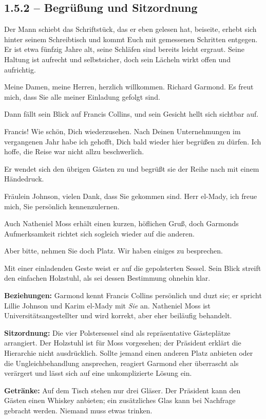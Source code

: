 \subsection{1.5.2 -- Begrü\ss{}ung und Sitzordnung}
\begin{vorlesetextalle}
Der Mann schiebt das Schriftstück, das er eben gelesen hat, beiseite, erhebt sich hinter seinem Schreibtisch und kommt Euch mit gemessenen Schritten entgegen. Er ist etwa fünfzig Jahre alt, seine Schläfen sind bereits leicht ergraut. Seine Haltung ist aufrecht und selbstsicher, doch sein Lächeln wirkt offen und aufrichtig.

\glqq{}Meine Damen, meine Herren, herzlich willkommen. Richard Garmond. Es freut mich, dass Sie alle meiner Einladung gefolgt sind.\grqq{}

Dann fällt sein Blick auf Francis Collins, und sein Gesicht hellt sich sichtbar auf.

\glqq{}Francis! Wie schön, Dich wiederzusehen. Nach Deinen Unternehmungen im vergangenen Jahr habe ich gehofft, Dich bald wieder hier begrü\ss{}en zu dürfen. Ich hoffe, die Reise war nicht allzu beschwerlich.\grqq{}

Er wendet sich den übrigen Gästen zu und begrü\ss{}t sie der Reihe nach mit einem Händedruck.

\glqq{}Fräulein Johnson, vielen Dank, dass Sie gekommen sind. Herr el-Mady, ich freue mich, Sie persönlich kennenzulernen.\grqq{}

Auch Natheniel Moss erhält einen kurzen, höflichen Gru\ss{}, doch Garmonds Aufmerksamkeit richtet sich sogleich wieder auf die anderen.

\glqq{}Aber bitte, nehmen Sie doch Platz. Wir haben einiges zu besprechen.\grqq{}

Mit einer einladenden Geste weist er auf die gepolsterten Sessel. Sein Blick streift den einfachen Holzstuhl, als sei dessen Bestimmung ohnehin klar.
\end{vorlesetextalle}

\begin{meisterinfo}
\textbf{Beziehungen:} Garmond kennt Francis Collins persönlich und duzt sie; er spricht Lillie Johnson und Karim el-Mady mit \emph{Sie} an. Natheniel Moss ist Universitätsangestellter und wird korrekt, aber eher beiläufig behandelt.

\textbf{Sitzordnung:} Die vier Polstersessel sind als repräsentative Gästeplätze arrangiert. Der Holzstuhl ist für Moss vorgesehen; der Präsident erklärt die Hierarchie nicht ausdrücklich. Sollte jemand einen anderen Platz anbieten oder die Ungleichbehandlung ansprechen, reagiert Garmond eher überrascht als verärgert und lässt sich auf eine unkomplizierte Lösung ein.

\textbf{Getränke:} Auf dem Tisch stehen nur drei Gläser. Der Präsident kann den Gästen einen Whiskey anbieten; ein zusätzliches Glas kann bei Nachfrage gebracht werden. Niemand muss etwas trinken.
\end{meisterinfo}

